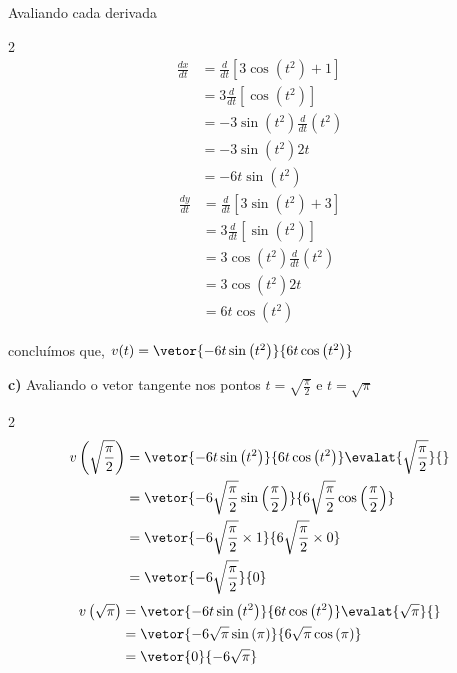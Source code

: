 \documentclass[a4paper,12pt,fleqn]{article}
\begin{document}
\begin{answer}
Avaliando cada derivada
\begin{multicols}{2}
\begin{align*}
  \frac{dx}{dt}
  & = \frac{d}{dt}\left[3 \cos\left(t^2\right) +1\right] \\[2mm]
  & = 3\frac{d}{dt}\left[\cos\left(t^2\right)\right]     \\[2mm]
  & = -3\sin\left(t^2\right)\frac{d}{dt}\left(t^2\right) \\[2mm]
  & = -3\sin\left(t^2\right)2t \\[2mm]
  & = -6t \sin\left(t^2\right)
\end{align*}
\begin{align*}
  \frac{dy}{dt}
  & = \frac{d}{dt}\left[3 \sin\left(t^2\right) +3\right]   \\[2mm]
  & = 3 \frac{d}{dt}\left[\sin\left(t^2\right)\right]      \\[2mm]
  & = 3 \cos\left(t^2\right) \frac{d}{dt}\left(t^2\right)  \\[2mm]
  & = 3 \cos\left(t^2\right) 2t                            \\[2mm]
  & = 6 t \cos\left(t^2\right)
\end{align*}
\end{multicols}
concluímos que,
\(
  v(t) = \vetor%
    {-6t \sin\left(t^2\right)}
    { 6t \cos\left(t^2\right)}
\)

\bigskip
\textbf{c)} \quad
Avaliando o vetor tangente nos pontos
$t=\sqrt{\frac{\pi}{2}}$ e $t=\sqrt{\pi}$
\begin{multicols}{2}
\begin{align*}
  v\left(\sqrt{\frac{\pi}{2}}\right)
  & = \vetor
    {-6t \sin\left(t^2\right)}
    { 6t \cos\left(t^2\right)}
    \evalat{\sqrt{\frac{\pi}{2}}}{} \\
  & = \vetor
    {-6\sqrt{\frac{\pi}{2}} \sin\left(\frac{\pi}{2}\right)}
    { 6\sqrt{\frac{\pi}{2}} \cos\left(\frac{\pi}{2}\right)}
    \\
  & = \vetor
    {-6\sqrt{\frac{\pi}{2}} \times 1}
    { 6\sqrt{\frac{\pi}{2}} \times 0}
    \\
  & = \vetor{-6\sqrt{\frac{\pi}{2}}}{0}
\end{align*}
\newcolumn
\begin{align*}
  v\left(\sqrt{\pi}\right)
  & = \vetor
    {-6t \sin\left(t^2\right)}
    { 6t \cos\left(t^2\right)}
    \evalat{\sqrt{\pi}}{} \\
    & = \vetor
    {-6\sqrt{\pi} \sin\left(\pi\right)}
    { 6\sqrt{\pi} \cos\left(\pi\right)}
    \\
  & = \vetor{0}{-6\sqrt{\pi}}
\end{align*}
\end{multicols}
\end{answer}
\end{document}
